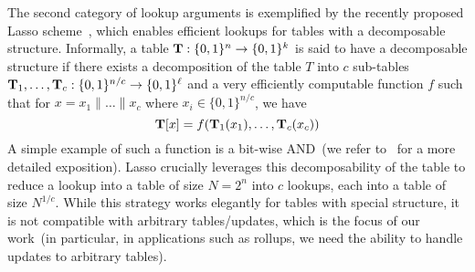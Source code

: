 
\smallskip

 The second category of lookup arguments is exemplified by the recently proposed Lasso scheme~\cite{lasso,jolt}, which enables efficient lookups for tables with a decomposable structure. Informally, a table $\mathbf{T}:\{0,1\}^n\to \{0,1\}^k$ is said to have a decomposable structure if there exists a decomposition of the table $T$ into $c$ sub-tables $\mathbf{T}_1,\ldots,\mathbf{T}_c:\{0,1\}^{n/c} \to\{0,1\}^\ell$ and a very efficiently computable function $f$ such that for $x = x_1\|\ldots\|x_c$ where $x_i \in \{0,1\}^{n/c}$, we have
\[\mathbf{T}[x] = f(\mathbf{T}_1(x_1),\ldots,\mathbf{T}_c(x_c))\]
A simple example of such a function is a bit-wise AND~(we refer to~\cite{lasso,jolt} for a more detailed exposition). Lasso crucially leverages this decomposability of the table to reduce a lookup into a table of size $N=2^n$ into $c$ lookups, each into a table of size $N^{1/c}$. While this strategy works elegantly for tables with special structure, it is not compatible with arbitrary tables/updates, which is the focus of our work~(in particular, in applications such as rollups, we need the ability to handle updates to arbitrary tables).

